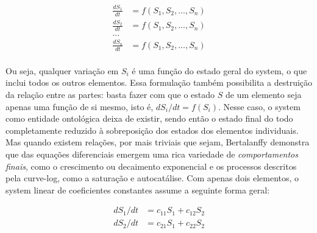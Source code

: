 \documentclass[./main.tex]{subfiles}
\begin{document}
\begin{linenomath*}
\begin{equation}
\label{eq:systems}
\begin{split}
    \frac{dS_1}{dt} &= f(S_1, S_2, ..., S_n)\\
    \frac{dS_2}{dt} &= f(S_1, S_2, ..., S_n)\\
    ...\\
    \frac{dS_n}{dt} &= f(S_1, S_2, ..., S_n)\\
\end{split}
\end{equation}
\end{linenomath*}
Ou seja, qualquer variação em $S_i$ é uma função do estado geral do \gls{system}, o que inclui todos os outros elementos. Essa formulação também possibilita a destruição da relação entre as partes: basta fazer com que o estado $S$ de um elemento seja apenas uma função de si mesmo, isto é,  $dS_i/dt = f(S_i)$. Nesse caso, o \gls{system} como entidade ontológica deixa de existir, sendo então o estado final do todo completamente reduzido à sobreposição dos estados dos elementos individuais. Mas quando existem relações, por mais triviais que sejam, Bertalanffy demonstra que das equações diferenciais emergem uma rica variedade de \textit{comportamentos finais}, como o crescimento ou decaimento exponencial e os processos descritos pela \gls{curve-log}, como a saturação e autocatálise. Com apenas dois elementos, o \gls{system} linear de coeficientes constantes assume a seguinte forma geral:
\begin{linenomath*}
\[
\begin{split}
    dS_1/dt &= c_{11}S_1 + c_{12}S_2\\
    dS_2/dt &= c_{21}S_1 + c_{22}S_2\\
\end{split}
\]
\end{linenomath*}
\end{document}
